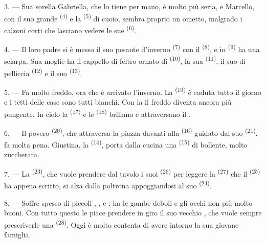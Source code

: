 3. --- Sua sorella Gabriella, che lo tiene per mano, è molto più seria, e Marcello, con
il suo grande  \textsuperscript{(4)} e la 
\textsuperscript{(5)} di cuoio, sembra proprio un ometto, malgrado i calzoni corti che
lasciano vedere le sue  \textsuperscript{(6)}.

4. --- Il loro padre si è messo il suo pesante  d'inverno
\textsuperscript{(7)} con il  \textsuperscript{(8)}, e in
 \textsuperscript{(9)} ha una sciarpa. Sua moglie ha il cappello di
feltro ornato di  \textsuperscript{(10)}, la sua 
\textsuperscript{(11)}, il suo  di pelliccia \textsuperscript{(12)} e il
suo  \textsuperscript{(13)}.

5. --- Fa molto freddo, ora che è arrivato l'inverno. La 
\textsuperscript{(19)} è caduta tutto il giorno e i tetti delle case sono tutti
bianchi. Con la  il freddo diventa ancora più pungente. In cielo la
 \textsuperscript{(17)} e le  \textsuperscript{(18)}
brillano e attraversano il .

\VUsaut{4.2mm}
\VUsaut{3.0mm}

6. --- Il povero  \textsuperscript{(20)}, che attraversa la piazza davanti
alla  \textsuperscript{(16)} guidato dal suo 
\textsuperscript{(21)}, fa molta pena. Giustina, la 
\textsuperscript{(14)}, porta dalla cucina una 
\textsuperscript{(15)} di  bollente, molto zuccherata.

7. --- La  \textsuperscript{(23)}, che vuole prendere dal tavolo i suoi
 \textsuperscript{(26)} per leggere la 
\textsuperscript{(27)} che il  \textsuperscript{(25)} ha appena
scritto, si alza dalla poltrona appoggiandosi al suo 
\textsuperscript{(24)}.

8. --- Soffre spesso di piccoli , ,
 e ; ha le gambe deboli e gli occhi non più
molto buoni. Con tutto questo le piace prendere in giro il suo vecchio
, che vuole sempre prescriverle una 
\textsuperscript{(28)}. Oggi è molto contenta di avere intorno la sua giovane
famiglia.


